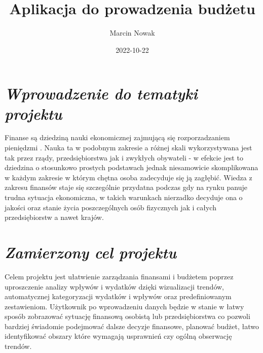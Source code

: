 \documentclass[a4paper,12pt]{report}
\newcommand{\customstyletitle}[1]{\Huge{\textbf{#1}}}
\newcommand{\customstylechapter}[1]{\large{\textit{#1}}}
\begin{document}
\title{\customstyletitle{Aplikacja do prowadzenia budżetu}}
\author{Marcin Nowak}
\date{2022-10-22}

\maketitle                          %
\let\cleardoublepage\clearpage

\renewcommand*\contentsname{Spis treści}
\tableofcontents                    %



\chapter{\customstylechapter{Wprowadzenie do tematyki projektu}}
Finanse są dziedziną nauki ekonomicznej zajmującą się rozporzadzaniem pieniędzmi
 \cite{wiki_ekonomia}. Nauka ta w podobnym zakresie a różnej skali 
wykorzystywana jest tak przez rządy, przedsiębiorstwa jak i zwykłych obywateli - 
w efekcie jest to dziedzina o stosunkowo prostych podstawach jednak niesamowicie
skomplikowana w każdym zakresie w którym chętna osoba zadecyduje się ją zagłębić. 
Wiedza z zakresu finansów staje się szczególnie przydatna podczas gdy na rynku 
panuje trudna sytuacja ekonomiczna, w takich warunkach nierzadko decyduje ona o 
jakości oraz stanie życia poszczególnych osób fizycznych jak i całych 
przedsiębiorstw a nawet krajów. 
%
\chapter{\customstylechapter{Zamierzony cel projektu}}
Celem projektu jest ułatwienie zarządzania finansami i budżetem poprzez 
uproszczenie analizy wpływów i wydatków dzięki wizualizacji trendów, 
automatycznej kategoryzacji wydatków i wpływów oraz predefiniowanym 
zestawieniom. Użytkownik po wprowadzeniu danych będzie w stanie w łatwy sposób 
zobrazować sytuację finansową osobistą lub przedsiębiorstwa co pozwoli 
bardziej świadomie podejmować dalsze decyzje finansowe, planować budżet, łatwo 
identyfikować obszary które wymagają usprawnień czy ogólną obserwację trendów.
%
\end{document}
